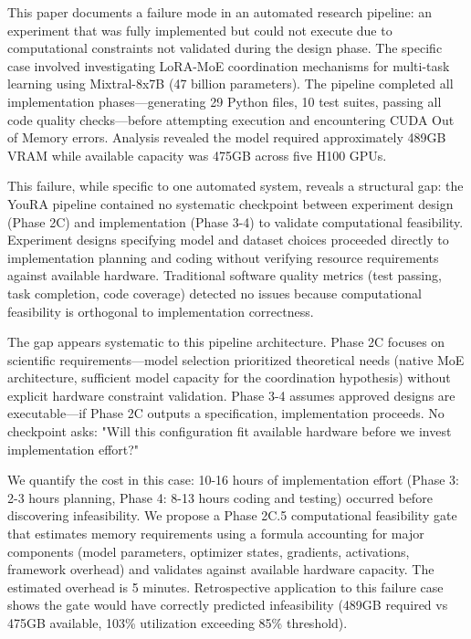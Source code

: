 
This paper documents a failure mode in an automated research pipeline: an experiment that was fully implemented but could not execute due to computational constraints not validated during the design phase. The specific case involved investigating LoRA-MoE coordination mechanisms for multi-task learning using Mixtral-8x7B (47 billion parameters). The pipeline completed all implementation phases—generating 29 Python files, 10 test suites, passing all code quality checks—before attempting execution and encountering CUDA Out of Memory errors. Analysis revealed the model required approximately 489GB VRAM while available capacity was 475GB across five H100 GPUs.

This failure, while specific to one automated system, reveals a structural gap: the YouRA pipeline contained no systematic checkpoint between experiment design (Phase 2C) and implementation (Phase 3-4) to validate computational feasibility. Experiment designs specifying model and dataset choices proceeded directly to implementation planning and coding without verifying resource requirements against available hardware. Traditional software quality metrics (test passing, task completion, code coverage) detected no issues because computational feasibility is orthogonal to implementation correctness.

The gap appears systematic to this pipeline architecture. Phase 2C focuses on scientific requirements—model selection prioritized theoretical needs (native MoE architecture, sufficient model capacity for the coordination hypothesis) without explicit hardware constraint validation. Phase 3-4 assumes approved designs are executable—if Phase 2C outputs a specification, implementation proceeds. No checkpoint asks: "Will this configuration fit available hardware before we invest implementation effort?"

We quantify the cost in this case: 10-16 hours of implementation effort (Phase 3: 2-3 hours planning, Phase 4: 8-13 hours coding and testing) occurred before discovering infeasibility. We propose a Phase 2C.5 computational feasibility gate that estimates memory requirements using a formula accounting for major components (model parameters, optimizer states, gradients, activations, framework overhead) and validates against available hardware capacity. The estimated overhead is 5 minutes. Retrospective application to this failure case shows the gate would have correctly predicted infeasibility (489GB required vs 475GB available, 103\% utilization exceeding 85\% threshold).

